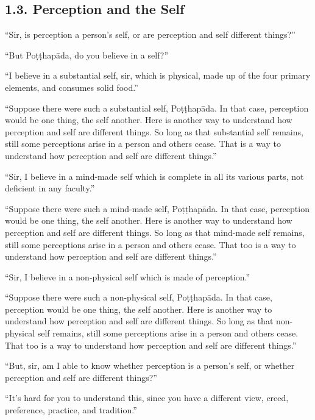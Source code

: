 \documentclass[12pt,openany]{book}%
\begin{document}
\subsection*{1.3. Perception and the Self }

“Sir, is perception a person’s self, or are perception and self different things?” 

“But \textsanskrit{Poṭṭhapāda}, do you believe in a self?” 

“I believe in a substantial self, sir, which is physical, made up of the four primary elements, and consumes solid food.” 

“Suppose there were such a substantial self, \textsanskrit{Poṭṭhapāda}. In that case, perception would be one thing, the self another. Here is another way to understand how perception and self are different things. So long as that substantial self remains, still some perceptions arise in a person and others cease. That is a way to understand how perception and self are different things.” 

“Sir, I believe in a mind-made self which is complete in all its various parts, not deficient in any faculty.” 

“Suppose there were such a mind-made self, \textsanskrit{Poṭṭhapāda}. In that case, perception would be one thing, the self another. Here is another way to understand how perception and self are different things. So long as that mind-made self remains, still some perceptions arise in a person and others cease. That too is a way to understand how perception and self are different things.” 

“Sir, I believe in a non-physical self which is made of perception.” 

“Suppose there were such a non-physical self, \textsanskrit{Poṭṭhapāda}. In that case, perception would be one thing, the self another. Here is another way to understand how perception and self are different things. So long as that non-physical self remains, still some perceptions arise in a person and others cease. That too is a way to understand how perception and self are different things.” 

“But, sir, am I able to know whether perception is a person’s self, or whether perception and self are different things?” 

“It’s hard for you to understand this, since you have a different view, creed, preference, practice, and tradition.” 
\end{document}
